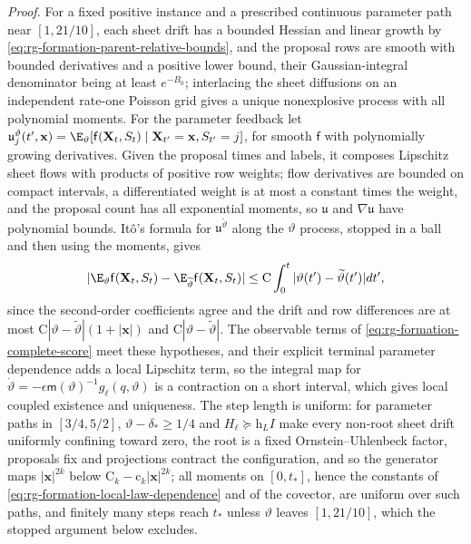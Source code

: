 \noindent\emph{Proof.}
For a fixed positive instance and a prescribed continuous parameter path near
\([1,21/10]\), each sheet drift has a bounded Hessian and linear growth by
\cref{eq:rg-formation-parent-relative-bounds}, and the proposal rows are
smooth with bounded derivatives and a positive lower bound, their
Gaussian-integral denominator being at least \(e^{-B_0}\); interlacing the
sheet diffusions on an independent rate-one Poisson grid gives a unique
nonexplosive process with all polynomial moments. For the parameter feedback
let \(\mathfrak u^\vartheta_j(t',\mathbf x)=\E_\vartheta[\mathsf f(\mathbf X_t,S_t)\mid
\mathbf X_{t'}=\mathbf x,S_{t'}=j]\), for smooth \(\mathsf f\) with polynomially
growing derivatives. Given the proposal times and labels, it composes
Lipschitz sheet flows with products of positive row weights; flow derivatives
are bounded on compact intervals, a differentiated weight is at most a
constant times the weight, and the proposal count has all exponential
moments, so \(\mathfrak u\) and \(\nabla\mathfrak u\) have polynomial bounds.
It\^o's formula for \(\mathfrak u^{\widetilde\vartheta}\) along the
\(\vartheta\) process, stopped in a ball and then using the moments, gives
\begin{equation}
 |\E_{\vartheta}\mathsf f(\mathbf X_t,S_t)
       -\E_{\widetilde\vartheta}\mathsf f(\mathbf X_t,S_t)|
 \le \mathrm C\int_0^t|\vartheta(t')-\widetilde\vartheta(t')| dt',
 \label{eq:rg-formation-local-law-dependence}
\end{equation}
since the second-order coefficients agree and the drift and row differences
are at most \(\mathrm C|\vartheta-\widetilde\vartheta|(1+|\mathbf x|)\) and
\(\mathrm C|\vartheta-\widetilde\vartheta|\). The observable terms of
\cref{eq:rg-formation-complete-score} meet these hypotheses, and their explicit
terminal parameter dependence adds a local Lipschitz term, so the integral map
for \(\dot\vartheta=-\epsilon\mathsf m(\vartheta)^{-1}g_\ell(q,\vartheta)\) is
a contraction on a short interval, which gives local coupled existence and
uniqueness. The step length is uniform: for parameter paths in
\([3/4,5/2]\), \(\vartheta-\delta_*\ge1/4\) and \(H_\ell\succeq\mathrm h_LI\)
make every non-root sheet drift uniformly confining toward zero, the root is a
fixed Ornstein--Uhlenbeck factor, proposals fix and projections contract the
configuration, and so the generator maps \(|\mathbf x|^{2k}\) below
\(\mathrm C_k-\mathrm c_k|\mathbf x|^{2k}\); all moments on \([0,t_*]\), hence
the constants of \cref{eq:rg-formation-local-law-dependence} and of the
covector, are uniform over such paths, and finitely many steps reach \(t_*\)
unless \(\vartheta\) leaves \([1,21/10]\), which the stopped argument below
excludes.

